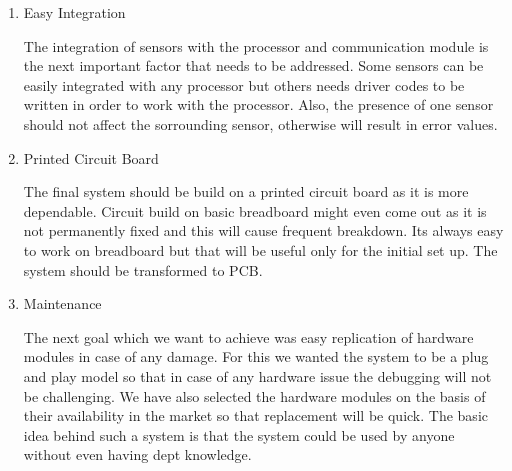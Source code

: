 \begin {enumerate}


\item {Easy Integration}

The integration of sensors with the processor and communication module is the next important factor that needs to be addressed. Some sensors can be easily integrated with any processor but others needs driver codes to be written in order to work with the processor. Also, the presence of one sensor should not affect the sorrounding sensor, otherwise will result in error values.

\item {Printed Circuit Board}

The final system should be build on a printed circuit board as it is more dependable. Circuit build on basic breadboard might even come out as it is not permanently fixed and this will cause frequent breakdown. Its always easy to work on breadboard but that will be useful only for the initial set up. The system should be transformed to PCB.


\item {Maintenance}

The next goal which we want to achieve was easy replication of hardware modules in case of any damage. For this we wanted the system to be a plug and play model so that in case of any hardware issue the debugging will not be challenging. We have also selected the hardware modules on the basis of their availability in the market so that replacement will be quick. The basic idea behind such a system is that the system could be used by anyone without even having dept knowledge.



\end{enumerate}
